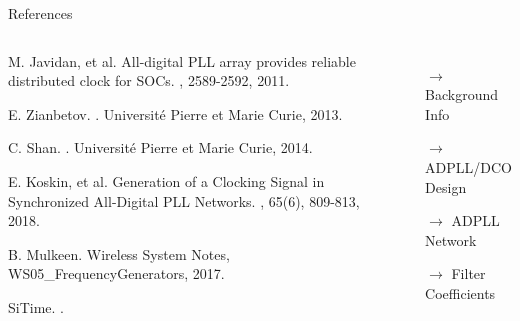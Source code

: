\documentclass{beamer}
\begin{document}
\begin{frame}{References}
	\begin{columns}
		\begin{thebibliography}{10}
		\begin{tiny}
		M. Javidan, et al.
		\newblock All-digital PLL array provides reliable distributed clock for SOCs.
		, 2589-2592, 2011. %
  	
	    E. Zianbetov.
	    .
		\newblock Universit\'e Pierre et Marie Curie, 2013. %
		
		C. Shan.
		.
		\newblock Universit\'e Pierre et Marie Curie, 2014. %
		
	    E. Koskin, et al.
	    \newblock Generation of a Clocking Signal in Synchronized All-Digital PLL Networks.
	    , 65(6), 809-813, 2018. %

	    B. Mulkeen.
	    \newblock Wireless System Notes, WS05\_FrequencyGenerators, 2017. %
	    
	    SiTime.
	    .
	    
	    \end{tiny}
	  	\end{thebibliography}
  		\begin{itemize}
  			\vspace{-1mm}
  			\item[$\rightarrow$] Background Info
  			\vspace{0.6 cm}
  			\item[$\rightarrow$] ADPLL/DCO Design
  			\vspace{0.6 cm}
  			\item[$\rightarrow$] ADPLL Network
  			\vspace{0.6 cm}
  			\item[$\rightarrow$] Filter Coefficients
  			\item[] ~
  			\item[] ~
  		\end{itemize}
  \end{columns}
\end{frame}
\end{document}
